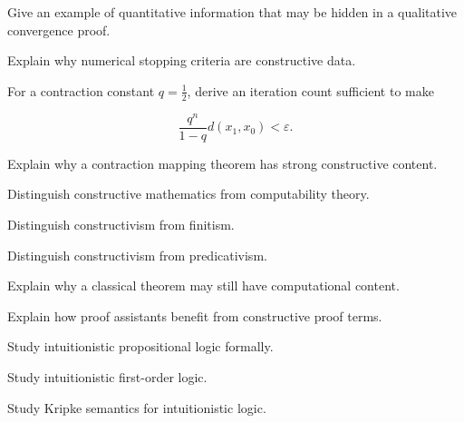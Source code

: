 \begin{exercise}[3]
Give an example of quantitative information that may be hidden in a
qualitative convergence proof.
\end{exercise}

\begin{exercise}[3]
Explain why numerical stopping criteria are constructive data.
\end{exercise}

\begin{exercise}[3]
For a contraction constant \(q=\frac12\), derive an iteration count sufficient
to make

\[
\frac{q^n}{1-q}d(x_1,x_0)
<
\varepsilon.
\]
\end{exercise}

\begin{exercise}[3]
Explain why a contraction mapping theorem has strong constructive content.
\end{exercise}

\begin{exercise}[3]
Distinguish constructive mathematics from computability theory.
\end{exercise}

\begin{exercise}[3]
Distinguish constructivism from finitism.
\end{exercise}

\begin{exercise}[3]
Distinguish constructivism from predicativism.
\end{exercise}

\begin{exercise}[3]
Explain why a classical theorem may still have computational content.
\end{exercise}

\begin{exercise}[3]
Explain how proof assistants benefit from constructive proof terms.
\end{exercise}

\begin{exercise}[4]
Study intuitionistic propositional logic formally.
\end{exercise}

\begin{exercise}[4]
Study intuitionistic first-order logic.
\end{exercise}

\begin{exercise}[4]
Study Kripke semantics for intuitionistic logic.
\end{exercise}

